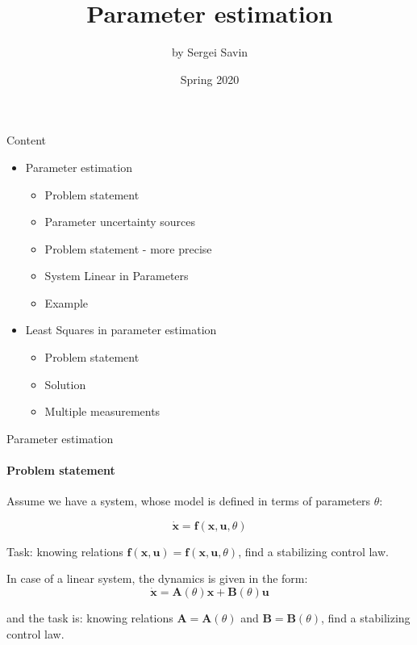 \documentclass{beamer}
\title{Parameter estimation}
\author{by Sergei Savin}
\date{Spring 2020}
\begin{document}
\maketitle


\begin{frame}{Content}
\begin{itemize}
\item Parameter estimation
\begin{itemize}
\item Problem statement
\item Parameter uncertainty sources
\item Problem statement - more precise
\item System Linear in Parameters
\item Example
\end{itemize}
\item Least Squares in parameter estimation
\begin{itemize}
\item Problem statement
\item Solution
\item Multiple measurements
\end{itemize}
\end{itemize}
\end{frame}

\begin{frame}{Parameter estimation}
\framesubtitle{Problem statement}
\begin{flushleft}

Assume we have a system, whose model is defined in terms of parameters $\theta$:

\[
\dot {\mathbf x} = \mathbf f(\mathbf x, \mathbf u, \theta)
\]

Task: knowing relations $\mathbf f(\mathbf x, \mathbf u) = \mathbf f(\mathbf x, \mathbf u, \theta)$, find a stabilizing control law.

\bigskip

In case of a linear system, the dynamics is given in the form:
\[
\dot {\mathbf x} = \mathbf A(\theta) \mathbf x + \mathbf B(\theta) \mathbf u
\]

and the task is: knowing relations $\mathbf A = \mathbf A(\theta)$ and $\mathbf B = \mathbf B(\theta)$, find a stabilizing control law.

\end{flushleft}
\end{frame}
\end{document}
